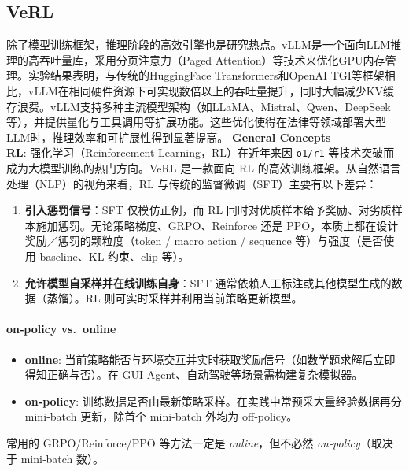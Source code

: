\documentclass{pkuthesis}
\begin{document}
\subsection{VeRL}
除了模型训练框架，推理阶段的高效引擎也是研究热点。vLLM是一个面向LLM推理的高吞吐量库，采用分页注意力（Paged Attention）等技术来优化GPU内存管理。实验结果表明，与传统的HuggingFace Transformers和OpenAI TGI等框架相比，vLLM在相同硬件资源下可实现数倍以上的吞吐量提升，同时大幅减少KV缓存浪费。vLLM支持多种主流模型架构（如LLaMA、Mistral、Qwen、DeepSeek等），并提供量化与工具调用等扩展功能。这些优化使得在法律等领域部署大型LLM时，推理效率和可扩展性得到显著提高。
\textbf{General Concepts}\\
\textbf{RL}: 强化学习（Reinforcement Learning，RL）在近年来因 \texttt{o1/r1} 等技术突破而成为大模型训练的热门方向。VeRL 是一款面向 RL 的高效训练框架。从自然语言处理（NLP）的视角来看，RL 与传统的监督微调（SFT）主要有以下差异：
\begin{enumerate}
    \item \textbf{引入惩罚信号}：SFT 仅模仿正例，而 RL 同时对优质样本给予奖励、对劣质样本施加惩罚。无论策略梯度、GRPO、Reinforce 还是 PPO，本质上都在设计奖励／惩罚的颗粒度（token / macro action / sequence 等）与强度（是否使用 baseline、KL 约束、clip 等）。
    \item \textbf{允许模型自采样并在线训练自身}：SFT 通常依赖人工标注或其他模型生成的数据（蒸馏）。RL 则可实时采样并利用当前策略更新模型。
\end{enumerate}

\paragraph{on‐policy vs.\ online}
\begin{itemize}
    \item \textbf{online}: 当前策略能否与环境交互并实时获取奖励信号（如数学题求解后立即得知正确与否）。在 GUI Agent、自动驾驶等场景需构建复杂模拟器。
    \item \textbf{on‐policy}: 训练数据是否由最新策略采样。在实践中常预采大量经验数据再分 mini‐batch 更新，除首个 mini‐batch 外均为 off‐policy。
\end{itemize}
常用的 GRPO/Reinforce/PPO 等方法一定是 \emph{online}，但不必然 \emph{on‐policy}（取决于 mini‐batch 数）。
\end{document}
